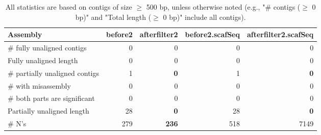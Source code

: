 \documentclass[12pt,a4paper]{article}
\begin{document}
\begin{table}[ht]
\begin{center}
\caption{All statistics are based on contigs of size $\geq$ 500 bp, unless otherwise noted (e.g., "\# contigs ($\geq$ 0 bp)" and "Total length ($\geq$ 0 bp)" include all contigs).}
\begin{tabular}{|l*{4}{|r}|}
\hline
Assembly & before2 & afterfilter2 & before2.scafSeq & afterfilter2.scafSeq \\ \hline
\# fully unaligned contigs & 0 & 0 & 0 & 0 \\ \hline
Fully unaligned length & 0 & 0 & 0 & 0 \\ \hline
\# partially unaligned contigs & 1 & {\bf 0} & 1 & {\bf 0} \\ \hline
\hspace{5mm}\# with misassembly & 0 & 0 & 0 & 0 \\ \hline
\hspace{5mm}\# both parts are significant & 0 & 0 & 0 & 0 \\ \hline
Partially unaligned length & 28 & {\bf 0} & 28 & {\bf 0} \\ \hline
\# N's & 279 & {\bf 236} & 518 & 7149 \\ \hline
\end{tabular}
\end{center}
\end{table}
\end{document}
